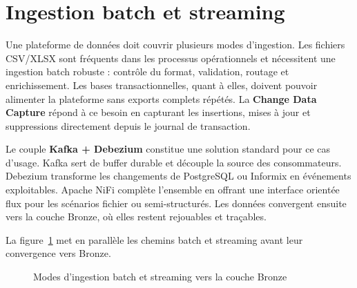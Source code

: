 \section{Ingestion batch et streaming}

Une plateforme de données doit couvrir plusieurs modes d'ingestion. Les fichiers CSV/XLSX sont fréquents dans les processus opérationnels et nécessitent une ingestion batch robuste : contrôle du format, validation, routage et enrichissement. Les bases transactionnelles, quant à elles, doivent pouvoir alimenter la plateforme sans exports complets répétés. La \textbf{Change Data Capture} répond à ce besoin en capturant les insertions, mises à jour et suppressions directement depuis le journal de transaction.

Le couple \textbf{Kafka + Debezium} constitue une solution standard pour ce cas d'usage. Kafka sert de buffer durable et découple la source des consommateurs. Debezium transforme les changements de PostgreSQL ou Informix en événements exploitables. Apache NiFi complète l'ensemble en offrant une interface orientée flux pour les scénarios fichier ou semi-structurés. Les données convergent ensuite vers la couche Bronze, où elles restent rejouables et traçables.

La figure~\ref{fig:ingestion-batch-streaming} met en parallèle les chemins batch et streaming avant leur convergence vers Bronze.

\begin{figure}[H]
\centering
{}
\caption{Modes d'ingestion batch et streaming vers la couche Bronze}
\label{fig:ingestion-batch-streaming}
\end{figure}

